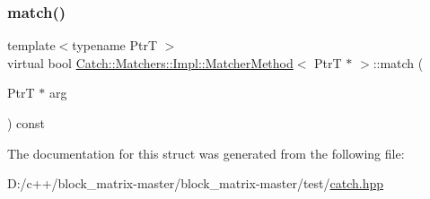 \subsubsection{\texorpdfstring{match()}{match()}}
{\footnotesize\ttfamily template$<$typename PtrT $>$ \\
virtual bool \mbox{\hyperlink{struct_catch_1_1_matchers_1_1_impl_1_1_matcher_method}{Catch\+::\+Matchers\+::\+Impl\+::\+Matcher\+Method}}$<$ PtrT $\ast$ $>$\+::match (\begin{DoxyParamCaption}\item[{PtrT $\ast$}]{arg }\end{DoxyParamCaption}) const\hspace{0.3cm}{\ttfamily [pure virtual]}}



The documentation for this struct was generated from the following file\+:\begin{DoxyCompactItemize}
\item 
D\+:/c++/block\+\_\+matrix-\/master/block\+\_\+matrix-\/master/test/\mbox{\hyperlink{catch_8hpp}{catch.\+hpp}}\end{DoxyCompactItemize}
